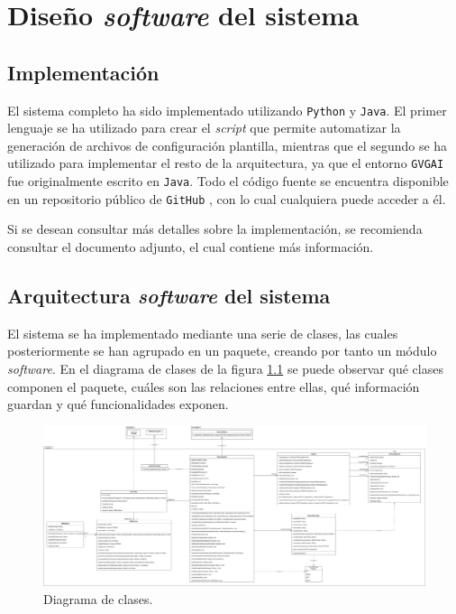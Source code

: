 
\chapter{Diseño \textit{software} del sistema}

\section{Implementación}

El sistema completo ha sido implementado utilizando \texttt{Python} y \texttt{Java}.
El primer lenguaje se ha utilizado para crear el \textit{script} que permite
automatizar la generación de archivos de configuración plantilla, mientras que el segundo
se ha utilizado para implementar el resto de la arquitectura, ya que el entorno
\texttt{GVGAI} fue originalmente escrito en \texttt{Java}. Todo el código fuente
se encuentra disponible en un repositorio público de \texttt{GitHub} \cite{Vladislav2020}, con lo cual
cualquiera puede acceder a él.

Si se desean consultar más detalles sobre la implementación, se recomienda consultar
el documento adjunto, el cual contiene más información.

\section{Arquitectura \textit{software} del sistema}

El sistema se ha implementado mediante una serie de clases, las cuales posteriormente
se han agrupado en un paquete, creando por tanto un módulo \textit{software}. En el diagrama
de clases de la figura \ref{fig:class_diagram} se puede observar qué clases componen
el paquete, cuáles son las relaciones entre ellas, qué información guardan y
qué funcionalidades exponen.

\begin{figure}[H]
    \centering
    \includegraphics[trim=0cm 0cm 50cm 0cm, clip=true, angle=90, origin=c, scale=0.28]{img/CH07/class_diagram.png}
    \caption{Diagrama de clases.}
    \label{fig:class_diagram}
\end{figure}

